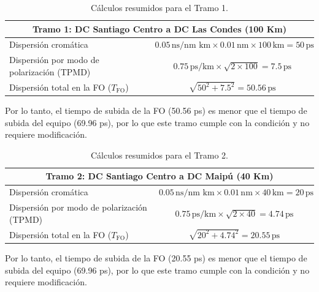 \begin{itemize}
\begin{table}[H]
	\centering
	\renewcommand{\arraystretch}{1.5}
	\begin{tabular}{|l|c|}
		\hline
		\multicolumn{2}{|c|}{\textbf{Tramo 1: DC Santiago Centro a DC Las Condes (100 Km)}} \\ \hline
		Dispersión cromática                      & $0.05 \, \text{ns/nm km} \times 0.01 \, \text{nm} \times 100 \, \text{km} = 50 \, \text{ps}$ \\ \hline
		Dispersión por modo de polarización (TPMD) & $0.75 \, \text{ps/km} \times \sqrt{2 \times 100} = 7.5 \, \text{ps}$ \\ \hline
		Dispersión total en la FO (\(T_{\text{FO}}\)) & $\sqrt{50^2 + 7.5^2} = 50.56 \, \text{ps}$ \\ \hline
	\end{tabular}
	\caption{Cálculos resumidos para el Tramo 1.}
\end{table}

Por lo tanto, el tiempo de subida de la FO (50.56 ps) es menor que el tiempo de subida del equipo (69.96 ps), por lo que este tramo cumple con la condición y no requiere modificación.

\begin{table}[H]
	\centering
	\renewcommand{\arraystretch}{1.5}
	\begin{tabular}{|l|c|}
		\hline
		\multicolumn{2}{|c|}{\textbf{Tramo 2: DC Santiago Centro a DC Maipú (40 Km)}} \\ \hline
		Dispersión cromática                      & $0.05 \, \text{ns/nm km} \times 0.01 \, \text{nm} \times 40 \, \text{km} = 20 \, \text{ps}$ \\ \hline
		Dispersión por modo de polarización (TPMD) & $0.75 \, \text{ps/km} \times \sqrt{2 \times 40} = 4.74 \, \text{ps}$ \\ \hline
		Dispersión total en la FO (\(T_{\text{FO}}\)) & $\sqrt{20^2 + 4.74^2} = 20.55 \, \text{ps}$ \\ \hline
	\end{tabular}
	\caption{Cálculos resumidos para el Tramo 2.}
\end{table}

Por lo tanto, el tiempo de subida de la FO (20.55 ps) es menor que el tiempo de subida del equipo (69.96 ps), por lo que este tramo cumple con la condición y no requiere modificación.


\end{itemize}
